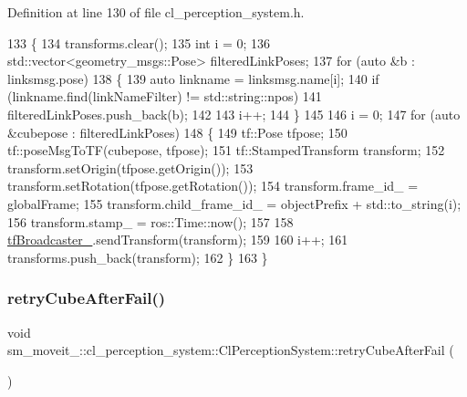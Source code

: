 Definition at line 130 of file cl\+\_\+perception\+\_\+system.\+h.


\begin{DoxyCode}
133   \{
134     transforms.clear();
135     \textcolor{keywordtype}{int} i = 0;
136     std::vector<geometry\_msgs::Pose> filteredLinkPoses;
137     \textcolor{keywordflow}{for} (\textcolor{keyword}{auto} &b : linksmsg.pose)
138     \{
139       \textcolor{keyword}{auto} linkname = linksmsg.name[i];
140       \textcolor{keywordflow}{if} (linkname.find(linkNameFilter) != std::string::npos)
141         filteredLinkPoses.push\_back(b);
142 
143       i++;
144     \}
145 
146     i = 0;
147     \textcolor{keywordflow}{for} (\textcolor{keyword}{auto} &cubepose : filteredLinkPoses)
148     \{
149       tf::Pose tfpose;
150       tf::poseMsgToTF(cubepose, tfpose);
151       tf::StampedTransform transform;
152       transform.setOrigin(tfpose.getOrigin());
153       transform.setRotation(tfpose.getRotation());
154       transform.frame\_id\_ = globalFrame;
155       transform.child\_frame\_id\_ = objectPrefix + std::to\_string(i);
156       transform.stamp\_ = ros::Time::now();
157 
158       \hyperlink{classsm__moveit__3_1_1cl__perception__system_1_1ClPerceptionSystem_a4b10961feb7c1609a6260656f20798d8}{tfBroadcaster\_}.sendTransform(transform);
159 
160       i++;
161       transforms.push\_back(transform);
162     \}
163   \}
\end{DoxyCode}
\mbox{\label{classsm__moveit__3_1_1cl__perception__system_1_1ClPerceptionSystem_a06bf8ed0f64662a6dde713f5678476f5}} 
\subsubsection{\texorpdfstring{retry\+Cube\+After\+Fail()}{retryCubeAfterFail()}}
{\footnotesize\ttfamily void sm\+\_\+moveit\+\_\+::cl\+\_\+perception\+\_\+system\+::\+Cl\+Perception\+System\+::retry\+Cube\+After\+Fail (\begin{DoxyParamCaption}{ }\end{DoxyParamCaption})\hspace{0.3cm}{\ttfamily [inline]}}



